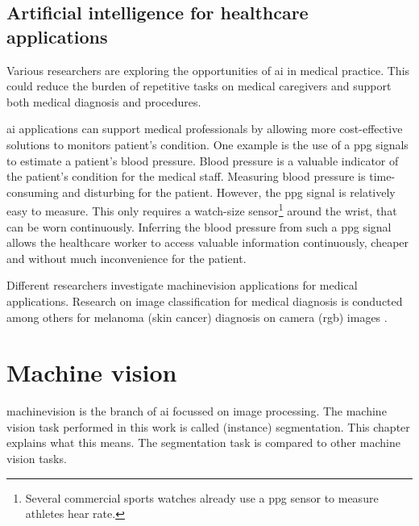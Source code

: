 \subsection{Artificial intelligence for healthcare applications}

\par{
    Various researchers are exploring the opportunities of \Gls{ai} in medical practice.
    This could reduce the burden of repetitive tasks on medical caregivers and support both medical diagnosis and procedures.
}
\par{
    \Gls{ai} applications can support medical professionals by allowing more cost-effective solutions to monitors patient's condition.
    One example is the use of a \acrfull{ppg} signals to estimate a patient's blood pressure.
    Blood pressure is a valuable indicator of the patient's condition for the medical staff.
    Measuring blood pressure is time-consuming and disturbing for the patient. 
    However, the \acrshort{ppg} signal is relatively easy to measure. This only requires a watch-size sensor\footnote{Several commercial sports watches already use a \acrshort{ppg} sensor to measure athletes hear rate.} 
    around the wrist, that can be worn continuously.
    Inferring the blood pressure from such a \acrshort{ppg} signal\cite{Khalid2018} allows the healthcare worker to access valuable information continuously, cheaper and without much inconvenience for the patient.
}
\par{
    Different researchers investigate \Gls{machinevision} applications for medical applications. 
    Research on image classification for medical diagnosis is conducted among others for melanoma (skin cancer) diagnosis on camera (\acrshort{rgb}) images \cite{Vocaturo2019}.
}
\section{Machine vision}
\par{
    \Gls{machinevision} is the branch of \Gls{ai} focussed on image processing.
    The machine vision task performed in this work is called (instance) \Gls{segmentation}.
    This chapter explains what this means. 
    The segmentation task is compared to other machine vision tasks.
}

